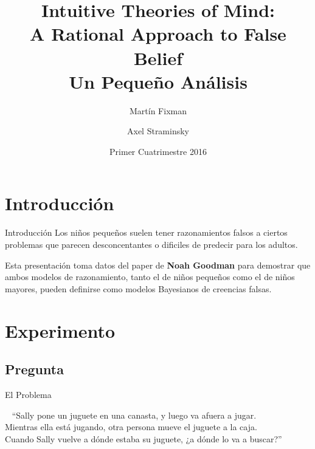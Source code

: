 \documentclass{beamer}
\title{Intuitive Theories of Mind: \\ A Rational Approach to False Belief \\ \vspace{1ex} {\large Un Pequeño Análisis}}
\author[Grupo 9]{%
	Martín Fixman \and
	Axel Straminsky
}
\date{Primer Cuatrimestre 2016}
\begin{document}
\begin{frame}[fragile]
\titlepage{}
\end{frame}

\section{Introducción}

\begin{frame}[fragile]{Introducción}
Los niños pequeños suelen tener razonamientos falsos a ciertos problemas que parecen desconcentantes o dificiles de predecir para los adultos.

Esta presentación toma datos del paper de \textbf{Noah Goodman}\cite{goodman92} para demostrar que ambos modelos de razonamiento, tanto el de niños pequeños como el de niños mayores, pueden definirse como modelos Bayesianos de creencias falsas.
\end{frame}

\section{Experimento}

\subsection{Pregunta}

\begin{frame}[fragile]{El Problema}
\begin{block}{\ \vspace{1em}}
``Sally pone un juguete en una canasta, y luego va afuera a jugar. \\
Mientras ella está jugando, otra persona mueve el juguete a la caja. \\
Cuando Sally vuelve a dónde estaba su juguete, ¿a dónde lo va a buscar?''
\end{block}

\vspace{1em}

\end{frame}
\end{document}
